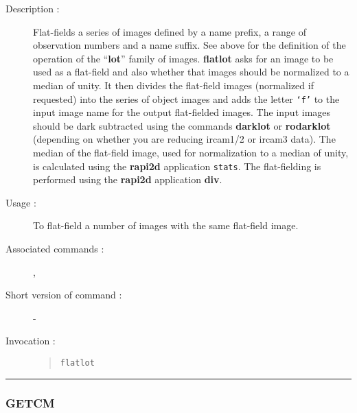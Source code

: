 \begin{description}

\item[Description :] Flat-fields a series of images defined by a name
prefix, a range of observation numbers and a name suffix.  See above
for the definition of the operation of the ``{\bf lot}'' family of
images.  {\bf flatlot} asks for an image to be used as a flat-field and also
whether that images should be normalized to a median of unity.  It then
divides the flat-field images (normalized if requested) into the series
of object images and adds the letter {\tt `f'} to the input image name for
the output flat-fielded images.  The input images should be dark
subtracted using the commands {\bf darklot} or {\bf rodarklot} (depending on
whether you are reducing {\sc ircam1/2} or {\sc ircam3} data).  The
median of the flat-field image, used for normalization to a median of
unity, is calculated using the {\bf rapi2d} application {\tt stats}.  The
flat-fielding is performed using the {\bf rapi2d} application {\bf div}.

\item[Usage :] To flat-field a number of images with the same
flat-field image.
\item[Associated commands :] {\tt {}},
{\tt {}}
\item[Short version of command :] -
\item[Invocation :]

\begin{quote}{\tt  flatlot }\end{quote}

\end{description}

\hrule
\subsubsection*{\label{GETCM}GETCM}

